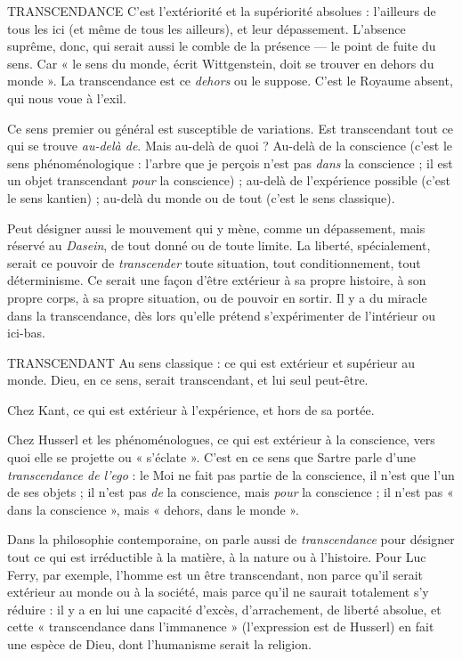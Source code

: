 TRANSCENDANCE C'est l’extériorité et la supériorité absolues : l’ailleurs
de tous les ici (et même de tous les ailleurs), et leur
dépassement. L'absence suprême, donc, qui serait aussi le comble de la présence
— le point de fuite du sens. Car « le sens du monde, écrit Wittgenstein,
doit se trouver en dehors du monde ». La transcendance est ce {\it dehors} ou le suppose.
C’est le Royaume absent, qui nous voue à l’exil.

Ce sens premier ou général est susceptible de variations. Est transcendant
tout ce qui se trouve {\it au-delà de}. Mais au-delà de quoi ? Au-delà de la conscience
(c’est le sens phénoménologique : l'arbre que je perçois n’est pas {\it dans} la
conscience ; il est un objet transcendant {\it pour} la conscience) ; au-delà de l’expérience
possible (c’est le sens kantien) ; au-delà du monde ou de tout (c’est le
sens classique).

Peut désigner aussi le mouvement qui y mène, comme un dépassement,
mais réservé au {\it Dasein}, de tout donné ou de toute limite. La liberté, spécialement,
serait ce pouvoir de {\it transcender} toute situation, tout conditionnement,
tout déterminisme. Ce serait une façon d’être extérieur à sa propre histoire, à
son propre corps, à sa propre situation, ou de pouvoir en sortir. Il y a du
miracle dans la transcendance, dès lors qu’elle prétend s’expérimenter de l’intérieur
ou ici-bas.

TRANSCENDANT Au sens classique : ce qui est extérieur et supérieur au
monde. Dieu, en ce sens, serait transcendant, et lui seul
peut-être.

Chez Kant, ce qui est extérieur à l'expérience, et hors de sa portée.

Chez Husserl et les phénoménologues, ce qui est extérieur à la conscience,
vers quoi elle se projette ou « s'éclate ». C’est en ce sens que Sartre parle d’une
{\it transcendance de l'ego} : le Moi ne fait pas partie de la conscience, il n’est que
l’un de ses objets ; il n’est pas {\it de} la conscience, mais {\it pour} la conscience ; il n’est
pas « dans la conscience », mais « dehors, dans le monde ».

Dans la philosophie contemporaine, on parle aussi de {\it transcendance} pour
désigner tout ce qui est irréductible à la matière, à la nature ou à l’histoire. Pour
Luc Ferry, par exemple, l'homme est un être transcendant, non parce qu’il
serait extérieur au monde ou à la société, mais parce qu’il ne saurait totalement
s’y réduire : il y a en lui une capacité d’excès, d’arrachement, de liberté absolue,
et cette « transcendance dans l’immanence » (l'expression est de Husserl) en fait
une espèce de Dieu, dont l’humanisme serait la religion.

